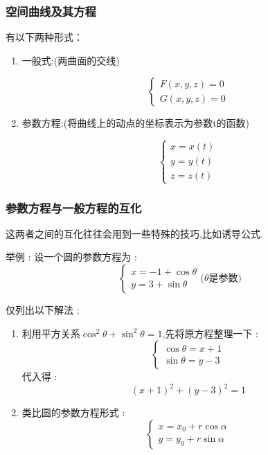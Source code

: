 {{    \subsubsection{空间曲线及其方程}{
      有以下两种形式：

      \begin{enumerate}
        \item {
              一般式:(两曲面的交线)

              $$
                \begin{cases}
                  F(x,y,z) = 0 \\
                  G(x,y,z) = 0
                \end{cases}
              $$
              }
        \item {
              参数方程:(将曲线上的动点的坐标表示为参数t的函数)

              $$
                \begin{cases}
                  x = x(t) \\
                  y = y(t) \\
                  z = z(t)
                \end{cases}
              $$
              }
      \end{enumerate}
    }%

    \subsubsection{参数方程与一般方程的互化}{
      这两者之间的互化往往会用到一些特殊的技巧,比如诱导公式.

      举例 : 设一个圆的参数方程为 : $$
        \begin{cases}
          x = -1 + \cos \theta \\
          y = 3 + \sin \theta
        \end{cases}
        \mbox{($\theta$是参数)}
      $$

      仅列出以下解法 :
      \begin{enumerate}
        \item {
              利用平方关系$\cos^2\theta + \sin^2\theta = 1$,先将原方程整理一下 : $$
                \begin{cases}
                  \cos\theta = x + 1 \\
                  \sin\theta = y - 3
                \end{cases}
              $$
              代入得 : $$
                (x + 1)^2 + (y - 3)^2 = 1
              $$
              }
        \item {
              类比圆的参数方程形式 : $$
                \begin{cases}
                  x = x_0 + r\cos\alpha \\
                  y = y_0 + r\sin\alpha
                \end{cases}
              $$

}
\end{enumerate}}}}
